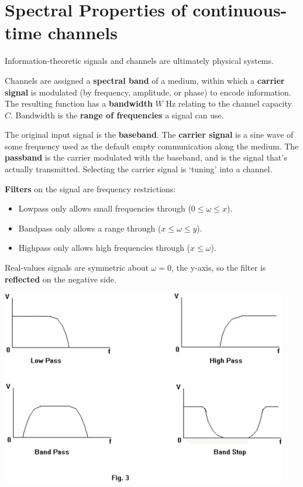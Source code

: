 \documentclass[a4paper, 11pt]{article}
\begin{document}
\section*{Spectral Properties of continuous-time channels}
{
    Information-theoretic signals and channels are ultimately physical systems.

    Channels are assigned a \textbf{spectral band} of a medium, within which a \textbf{carrier signal} is modulated (by frequency, amplitude, or phase) to encode information. The resulting function has a \textbf{bandwidth} \(W\) Hz relating to the channel capacity \(C\). Bandwidth is the \textbf{range of frequencies} a signal can use.

    The original input signal is the \textbf{baseband}. The \textbf{carrier signal} is a sine wave of some frequency used as the default empty communication along the medium. The \textbf{passband} is the carrier modulated with the baseband, and is the signal that's actually transmitted. Selecting the carrier signal is `tuning' into a channel.

    \begin{minipage}[t]{0.6\textwidth}
    \setlength{\parskip}{8pt}
    \textbf{Filters} on the signal are frequency restrictions:
    \begin{itemize}
    \item Lowpass only allows small frequencies through (\(0 \leq \omega \leq x\)).
    \item Bandpass only allows a range through (\(x \leq \omega \leq y\)).
    \item Highpass only allows high frequencies through (\(x \leq \omega\)).
    \end{itemize}

    Real-values signals are symmetric about \(\omega=0\), the y-axis, so the filter is \textbf{reflected} on the negative side.
    \end{minipage}
    \hspace{3mm}
    \begin{minipage}[t]{0.35\textwidth}
    \vspace{0pt}
    \centering
    \includegraphics[width=\textwidth]{filters.png}
    \end{minipage}
}
\end{document}
